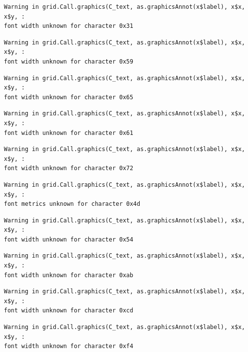 \documentclass[
  letterpaper,
  DIV=11,
  numbers=noendperiod]{scrreprt}
\begin{document}
\begin{verbatim}
Warning in grid.Call.graphics(C_text, as.graphicsAnnot(x$label), x$x, x$y, :
font width unknown for character 0x31
\end{verbatim}

\begin{verbatim}
Warning in grid.Call.graphics(C_text, as.graphicsAnnot(x$label), x$x, x$y, :
font width unknown for character 0x59
\end{verbatim}

\begin{verbatim}
Warning in grid.Call.graphics(C_text, as.graphicsAnnot(x$label), x$x, x$y, :
font width unknown for character 0x65
\end{verbatim}

\begin{verbatim}
Warning in grid.Call.graphics(C_text, as.graphicsAnnot(x$label), x$x, x$y, :
font width unknown for character 0x61
\end{verbatim}

\begin{verbatim}
Warning in grid.Call.graphics(C_text, as.graphicsAnnot(x$label), x$x, x$y, :
font width unknown for character 0x72
\end{verbatim}

\begin{verbatim}
Warning in grid.Call.graphics(C_text, as.graphicsAnnot(x$label), x$x, x$y, :
font metrics unknown for character 0x4d
\end{verbatim}

\begin{verbatim}
Warning in grid.Call.graphics(C_text, as.graphicsAnnot(x$label), x$x, x$y, :
font width unknown for character 0x54
\end{verbatim}

\begin{verbatim}
Warning in grid.Call.graphics(C_text, as.graphicsAnnot(x$label), x$x, x$y, :
font width unknown for character 0xab
\end{verbatim}

\begin{verbatim}
Warning in grid.Call.graphics(C_text, as.graphicsAnnot(x$label), x$x, x$y, :
font width unknown for character 0xcd
\end{verbatim}

\begin{verbatim}
Warning in grid.Call.graphics(C_text, as.graphicsAnnot(x$label), x$x, x$y, :
font width unknown for character 0xf4
\end{verbatim}
\end{document}
